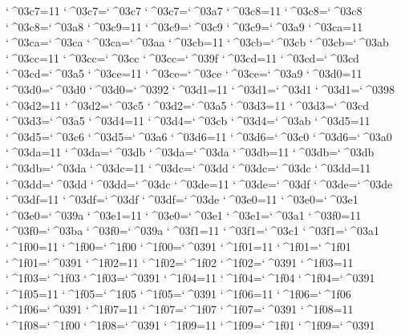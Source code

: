 \catcode`^^^^03c7=11 \lccode`^^^^03c7=`^^^^03c7 \uccode`^^^^03c7=`^^^^03a7 
\catcode`^^^^03c8=11 \lccode`^^^^03c8=`^^^^03c8 \uccode`^^^^03c8=`^^^^03a8 
\catcode`^^^^03c9=11 \lccode`^^^^03c9=`^^^^03c9 \uccode`^^^^03c9=`^^^^03a9 
\catcode`^^^^03ca=11 \lccode`^^^^03ca=`^^^^03ca \uccode`^^^^03ca=`^^^^03aa 
\catcode`^^^^03cb=11 \lccode`^^^^03cb=`^^^^03cb \uccode`^^^^03cb=`^^^^03ab 
\catcode`^^^^03cc=11 \lccode`^^^^03cc=`^^^^03cc \uccode`^^^^03cc=`^^^^039f 
\catcode`^^^^03cd=11 \lccode`^^^^03cd=`^^^^03cd \uccode`^^^^03cd=`^^^^03a5 
\catcode`^^^^03ce=11 \lccode`^^^^03ce=`^^^^03ce \uccode`^^^^03ce=`^^^^03a9 
\catcode`^^^^03d0=11 \lccode`^^^^03d0=`^^^^03d0 \uccode`^^^^03d0=`^^^^0392 
\catcode`^^^^03d1=11 \lccode`^^^^03d1=`^^^^03d1 \uccode`^^^^03d1=`^^^^0398 
\catcode`^^^^03d2=11 \lccode`^^^^03d2=`^^^^03c5 \uccode`^^^^03d2=`^^^^03a5 
\catcode`^^^^03d3=11 \lccode`^^^^03d3=`^^^^03cd \uccode`^^^^03d3=`^^^^03a5 
\catcode`^^^^03d4=11 \lccode`^^^^03d4=`^^^^03cb \uccode`^^^^03d4=`^^^^03ab 
\catcode`^^^^03d5=11 \lccode`^^^^03d5=`^^^^03c6 \uccode`^^^^03d5=`^^^^03a6 
\catcode`^^^^03d6=11 \lccode`^^^^03d6=`^^^^03c0 \uccode`^^^^03d6=`^^^^03a0 
\catcode`^^^^03da=11 \lccode`^^^^03da=`^^^^03db \uccode`^^^^03da=`^^^^03da 
\catcode`^^^^03db=11 \lccode`^^^^03db=`^^^^03db \uccode`^^^^03db=`^^^^03da 
\catcode`^^^^03dc=11 \lccode`^^^^03dc=`^^^^03dd \uccode`^^^^03dc=`^^^^03dc 
\catcode`^^^^03dd=11 \lccode`^^^^03dd=`^^^^03dd \uccode`^^^^03dd=`^^^^03dc 
\catcode`^^^^03de=11 \lccode`^^^^03de=`^^^^03df \uccode`^^^^03de=`^^^^03de 
\catcode`^^^^03df=11 \lccode`^^^^03df=`^^^^03df \uccode`^^^^03df=`^^^^03de 
\catcode`^^^^03e0=11 \lccode`^^^^03e0=`^^^^03e1 \uccode`^^^^03e0=`^^^^039a 
\catcode`^^^^03e1=11 \lccode`^^^^03e0=`^^^^03e1 \uccode`^^^^03e1=`^^^^03a1 
\catcode`^^^^03f0=11 \lccode`^^^^03f0=`^^^^03ba \uccode`^^^^03f0=`^^^^039a 
\catcode`^^^^03f1=11 \lccode`^^^^03f1=`^^^^03c1 \uccode`^^^^03f1=`^^^^03a1 
\catcode`^^^^1f00=11 \lccode`^^^^1f00=`^^^^1f00 \uccode`^^^^1f00=`^^^^0391 
\catcode`^^^^1f01=11 \lccode`^^^^1f01=`^^^^1f01 \uccode`^^^^1f01=`^^^^0391 
\catcode`^^^^1f02=11 \lccode`^^^^1f02=`^^^^1f02 \uccode`^^^^1f02=`^^^^0391 
\catcode`^^^^1f03=11 \lccode`^^^^1f03=`^^^^1f03 \uccode`^^^^1f03=`^^^^0391 
\catcode`^^^^1f04=11 \lccode`^^^^1f04=`^^^^1f04 \uccode`^^^^1f04=`^^^^0391 
\catcode`^^^^1f05=11 \lccode`^^^^1f05=`^^^^1f05 \uccode`^^^^1f05=`^^^^0391 
\catcode`^^^^1f06=11 \lccode`^^^^1f06=`^^^^1f06 \uccode`^^^^1f06=`^^^^0391 
\catcode`^^^^1f07=11 \lccode`^^^^1f07=`^^^^1f07 \uccode`^^^^1f07=`^^^^0391 
\catcode`^^^^1f08=11 \lccode`^^^^1f08=`^^^^1f00 \uccode`^^^^1f08=`^^^^0391 
\catcode`^^^^1f09=11 \lccode`^^^^1f09=`^^^^1f01 \uccode`^^^^1f09=`^^^^0391 
